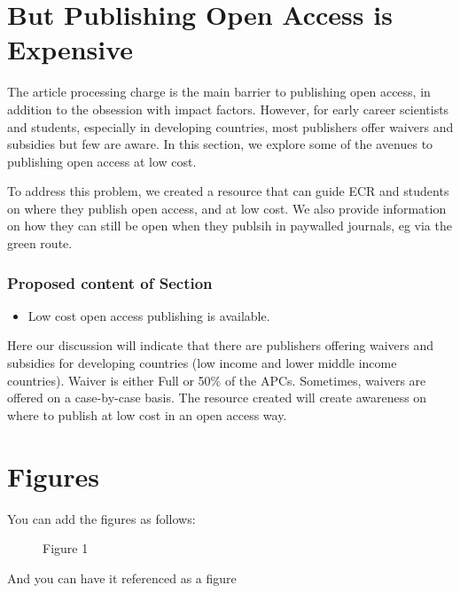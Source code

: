 \section*{But Publishing Open Access is
Expensive}\label{but-publishing-open-access-is-expensive}

The article processing charge is the main barrier to publishing open
access, in addition to the obsession with impact factors. However, for
early career scientists and students, especially in developing
countries, most publishers offer waivers and subsidies but few are
aware. In this section, we explore some of the avenues to publishing
open access at low cost.

To address this problem, we created a resource that can guide ECR and
students on where they publish open access, and at low cost. We also
provide information on how they can still be open when they publsih in
paywalled journals, eg via the green route.

\subsubsection{Proposed content of
Section}\label{proposed-content-of-section}

\begin{itemize}
\tightlist
\item
  Low cost open access publishing is available.
\end{itemize}

Here our discussion will indicate that there are publishers offering
waivers and subsidies for developing countries (low income and lower
middle income countries). Waiver is either Full or 50\% of the APCs.
Sometimes, waivers are offered on a case-by-case basis. The resource
created will create awareness on where to publish at low cost in an open
access way.

\section*{Figures}\label{figures}

You can add the figures as follows:

\begin{figure}[htbp]
\centering
\caption{Figure 1}
\end{figure}

And you can have it referenced as a figure

